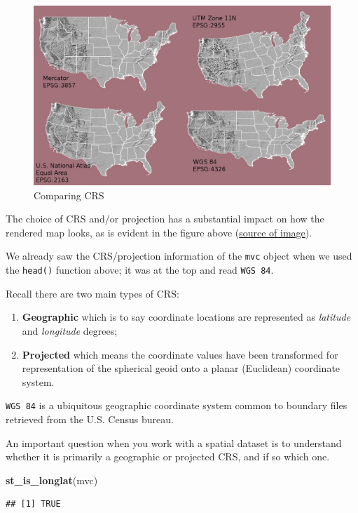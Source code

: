 \documentclass[
]{book}
\newenvironment{Shaded}{\begin{snugshade}}{\end{snugshade}}
\newcommand{\FunctionTok}[1]{\textcolor[rgb]{0.13,0.29,0.53}{\textbf{#1}}}
\newcommand{\NormalTok}[1]{#1}
\providecommand{\tightlist}{%
  \setlength{\itemsep}{0pt}\setlength{\parskip}{0pt}}
\begin{document}
\begin{figure}
\includegraphics[width=0.5\linewidth]{images/compare-crs} \caption{Comparing CRS}\label{fig:unnamed-chunk-14}
\end{figure}

The choice of CRS and/or projection has a substantial impact on how the rendered map looks, as is evident in the figure above (\href{https://datacarpentry.org/organization-geospatial/03-crs.html}{source of image}).

We already saw the CRS/projection information of the \texttt{mvc} object when we used the \texttt{head()} function above; it was at the top and read \texttt{WGS\ 84}.

Recall there are two main types of CRS:

\begin{enumerate}
\def\labelenumi{\arabic{enumi}.}
\tightlist
\item
  \textbf{Geographic} which is to say coordinate locations are represented as \emph{latitude} and \emph{longitude} degrees;
\item
  \textbf{Projected} which means the coordinate values have been transformed for representation of the spherical geoid onto a planar (Euclidean) coordinate system.
\end{enumerate}

\texttt{WGS\ 84} is a ubiquitous geographic coordinate system common to boundary files retrieved from the U.S. Census bureau.

An important question when you work with a spatial dataset is to understand whether it is primarily a geographic or projected CRS, and if so which one.

\begin{Shaded}
\begin{Highlighting}[]
\FunctionTok{st\_is\_longlat}\NormalTok{(mvc)}
\end{Highlighting}
\end{Shaded}

\begin{verbatim}
## [1] TRUE
\end{verbatim}
\end{document}
